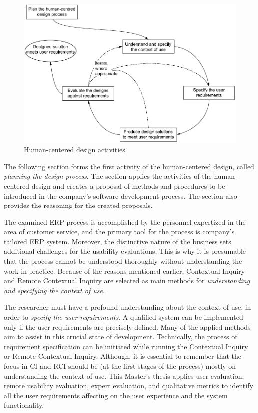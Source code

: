 \documentclass[12pt,a4paper,oneside,pdftex]{report}
\begin{document}
\begin{figure}[H]
  	\centering
    	\includegraphics[width=1.0\textwidth]{./images/hci_process.png}
  	\caption{Human-centered design activities.\citep{RefWorks:40}}
	\label{fig:hci_process}
\end{figure}



The following section forms the first activity of the human-centered design, called \emph{planning the design process}. The section applies the activities of the human-centered design and creates a proposal of methods and procedures to be introduced in the company's software development process. The section also provides the reasoning for the created proposals.

The examined ERP process is accomplished by the personnel expertized in the area of customer service, and the primary tool for the process is company's tailored ERP system. Moreover, the distinctive nature of the business sets additional challenges for the usability evaluations. This is why it is presumable that the process cannot be understood thoroughly without understanding the work in practice. Because of the reasons mentioned earlier, Contextual Inquiry and Remote Contextual Inquiry are selected as main methods for \emph{understanding and specifying the context of use}.

The researcher must have a profound understanding about the context of use, in order to \emph{specify the user requirements}. A qualified system can be implemented only if the user requirements are precisely defined. Many of the applied methods aim to assist in this crucial state of development. Technically, the process of requirement specification can be initiated while running the Contextual Inquiry or Remote Contextual Inquiry. Although, it is essential to remember that the focus in CI and RCI should be (at the first stages of the process) mostly on understanding the context of use. This Master's thesis applies user evaluation, remote usability evaluation, expert evaluation, and qualitative metrics to identify all the user requirements affecting on the user experience and the system functionality.
\end{document}
